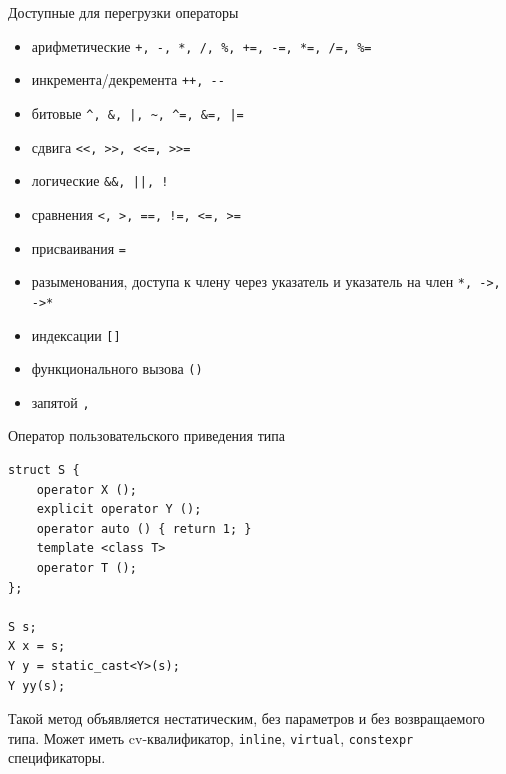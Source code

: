 \documentclass[unknownkeysallowed,xcolor=table]{beamer}
\begin{document}
\begin{frame}[fragile]{Доступные для перегрузки операторы}

\begin{itemize}
  \item арифметические \lstinline{+, -, *, /, %, +=, -=, *=, /=, %=}
  \item инкремента/декремента \lstinline{++, --}
  \item битовые \lstinline{^, &, |, ~, ^=, &=, |=}
  \item сдвига \lstinline{<<, >>, <<=, >>=}
  \item логические \lstinline{&&, ||, !}
  \item сравнения \lstinline{<, >, ==, !=, <=, >=}
  \item присваивания \lstinline{=}
  \item разыменования, доступа к члену через указатель и указатель на член \lstinline{*, ->, ->*}
  \item индексации \lstinline{[]}
  \item функционального вызова \lstinline{()}
  \item запятой \lstinline{,}
\end{itemize}

\end{frame}

\begin{frame}[fragile]{Оператор пользовательского приведения типа}

\begin{lstlisting}
struct S {
    operator X ();
    explicit operator Y ();
    operator auto () { return 1; }
    template <class T>
    operator T ();
};

S s;
X x = s;
Y y = static_cast<Y>(s);
Y yy(s);
\end{lstlisting}

\vspace{1em}

Такой метод объявляется нестатическим, без параметров и без возвращаемого типа. Может иметь cv-квалификатор, \lstinline{inline}, \lstinline{virtual}, \lstinline{constexpr} спецификаторы.

\end{frame}
\end{document}
